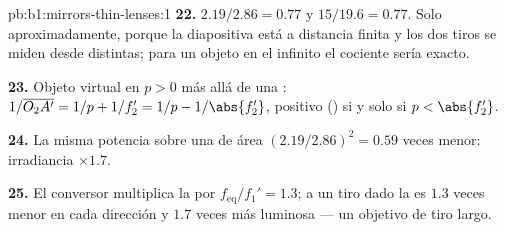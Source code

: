 \begin{solution}{pb:b1:mirrors-thin-lenses:1}
\textbf{22.} $2.19/2.86 = 0.77$ y $15/19.6 = 0.77$. Solo aproximadamente,
porque la diapositiva está a distancia finita y los dos tiros se miden
desde  distintas; para un objeto en el infinito el cociente sería
exacto.

\textbf{23.} Objeto virtual en $p > 0$ más allá de una :
$1/\overline{O_2A'} = 1/p + 1/f_2' = 1/p - 1/\abs{f_2'}$, positivo () si y solo si $p < \abs{f_2'}$.

\textbf{24.} La misma potencia sobre una  de área $(2.19/2.86)^2 = 0.59$
veces menor: irradiancia $\times 1.7$.

\textbf{25.} El conversor multiplica la  por
$f_{\mathrm{eq}}/f_1' = 1.3$; a un tiro dado la  es $1.3$
veces menor en cada dirección y $1.7$ veces más luminosa --- un objetivo
de tiro largo.
\end{solution}
